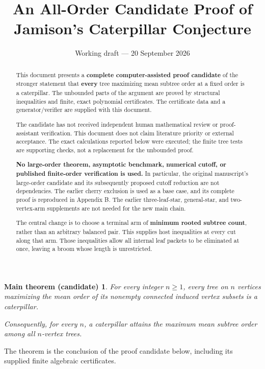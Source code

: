 \documentclass[11pt,letterpaper]{article}
\title{\LARGE\bfseries An All-Order Candidate Proof of\\[0.25em]
Jamison's Caterpillar Conjecture}
\author{}
\date{Working draft --- 20 September 2026}
\theoremstyle{plain}
\newtheorem*{maintheorem}{Main theorem (candidate)}
\begin{document}
\maketitle
\thispagestyle{plain}
\begin{abstract}
This document presents a \textbf{complete computer-assisted proof candidate} of the stronger statement that \textbf{every} tree maximizing mean subtree order at a fixed order is a caterpillar. The unbounded parts of the argument are proved by structural inequalities and finite, exact polynomial certificates. The certificate data and a generator/verifier are supplied with this document.

The candidate has not received independent human mathematical review or proof-assistant verification. This document does not claim literature priority or external acceptance. The exact calculations reported below were executed; the finite tree tests are supporting checks, not a replacement for the unbounded proof.

\textbf{No large-order theorem, asymptotic benchmark, numerical cutoff, or published finite-order verification is used.} In particular, the original manuscript's large-order candidate and its subsequently proposed cutoff reduction are not dependencies. The earlier cherry exclusion is used as a base case, and its complete proof is reproduced in Appendix B. The earlier three-leaf-star, general-star, and two-vertex-arm supplements are not needed for the new main chain.

The central change is to choose a terminal arm of \textbf{minimum rooted subtree count}, rather than an arbitrary balanced pair. This supplies host inequalities at every cut along that arm. Those inequalities allow all internal leaf packets to be eliminated at once, leaving a broom whose length is unrestricted.
\end{abstract}



\begin{maintheorem}\label{thm:main} For every integer \(n\ge1\), every tree on \(n\) vertices maximizing the mean order of its nonempty connected induced vertex subsets is a caterpillar.

Consequently, for every \(n\), a caterpillar attains the maximum mean subtree order among all \(n\)-vertex trees.
\end{maintheorem}

The theorem is the conclusion of the proof candidate below, including its supplied finite algebraic certificates.
\end{document}
